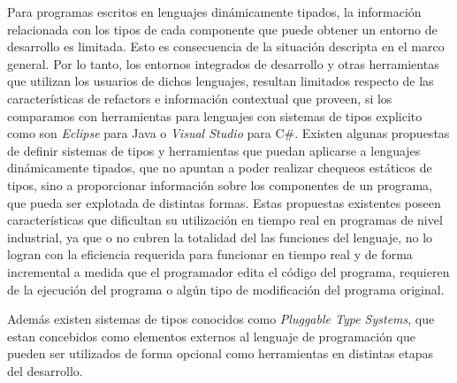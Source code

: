\documentclass[a4paper,10pt]{article}
\begin{document}
Para programas escritos en lenguajes dinámicamente tipados, la información relacionada con los tipos de cada componente que puede obtener un entorno de desarrollo es limitada. Esto es consecuencia de la situación descripta en el marco general.
Por lo tanto, los entornos integrados de desarrollo y otras herramientas que utilizan los usuarios de dichos lenguajes, resultan limitados respecto de las características de refactors e información contextual que proveen, si los comparamos con herramientas para lenguajes con sistemas de tipos explicito como son \emph{Eclipse} para Java o \emph{Visual Studio} para C\#. 
Existen algunas propuestas de definir sistemas de tipos y herramientas que puedan aplicarse a lenguajes dinámicamente tipados, que no apuntan a poder realizar chequeos estáticos de tipos, sino a proporcionar información sobre los componentes de un programa, que pueda ser explotada de distintas formas. Estas propuestas existentes poseen características que dificultan su utilización en tiempo real en programas de nivel industrial, ya que o no cubren la totalidad del las funciones del lenguaje\cite{Pluq09a,Wang01a,Pluq09a}, no lo logran con la eficiencia requerida para funcionar en tiempo real\cite{Ages96a,Spoo05a,Oxho92a} y de forma incremental a medida que el programador edita el código del programa, requieren de la ejecución del programa\cite{Haup11a} o algún tipo de modificación del programa original\cite{Grav90a,Alle13a}.

Además existen sistemas de tipos conocidos como \emph{Pluggable Type Systems}\cite{Brac04a}, que estan concebidos como elementos externos al lenguaje de programación que pueden ser utilizados de forma opcional como herramientas en distintas etapas del desarrollo.
\end{document}

